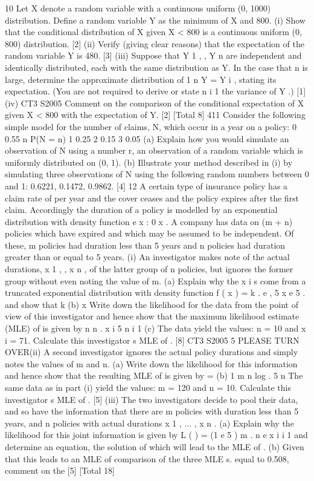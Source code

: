\documentclass[a4paper,12pt]{article}
\begin{document}
10
Let X denote a random variable with a continuous uniform (0, 1000) distribution.
Define a random variable Y as the minimum of X and 800.
(i)
Show that the conditional distribution of X given X < 800 is a continuous
uniform (0, 800) distribution.
[2]
(ii) Verify (giving clear reasons) that the expectation of the random variable Y is
480.
[3]
(iii) Suppose that Y 1 , , Y n are independent and identically distributed, each with
the same distribution as Y.
In the case that n is large, determine the approximate distribution of
1 n
Y =
Y i , stating its expectation. (You are not required to derive or state
n i 1
the variance of Y .)
[1]
(iv)
CT3 S2005
Comment on the comparison of the conditional expectation of X given X < 800
with the expectation of Y.
[2]
[Total 8]
411
Consider the following simple model for the number of claims, N, which occur in a
year on a policy:
0
0.55
n
P(N = n)
1
0.25
2
0.15
3
0.05
(a) Explain how you would simulate an observation of N using a number r, an
observation of a random variable which is uniformly distributed on (0, 1).
(b) Illustrate your method described in (i) by simulating three observations of N
using the following random numbers between 0 and 1:
0.6221, 0.1472, 0.9862.
[4]
12
A certain type of insurance policy has a claim rate of per year and the cover ceases
and the policy expires after the first claim. Accordingly the duration of a policy is
modelled by an exponential distribution with density function e x : 0 x
.
A company has data on (m + n) policies which have expired and which may be
assumed to be independent. Of these, m policies had duration less than 5 years and n
policies had duration greater than or equal to 5 years.
(i)
An investigator makes note of the actual durations, x 1 , , x n , of the latter
group of n policies, but ignores the former group without even noting the
value of m.
(a)
Explain why the x i s come from a truncated exponential distribution
with density function
f ( x ) = k . e
, 5
x
e 5 .
and show that k
(b)
x
Write down the likelihood for the data from the point of view of this
investigator and hence show that the maximum likelihood estimate
(MLE) of is given by
n
n
.
x i 5 n
i 1
(c)
The data yield the values: n = 10 and x i = 71. Calculate this
investigator s MLE of .
[8]
CT3 S2005
5
PLEASE TURN OVER(ii)
A second investigator ignores the actual policy durations and simply notes the
values of m and n.
(a)
Write down the likelihood for this information and hence show that the
resulting MLE of is given by
=
(b)
1
m n
log
.
5
n
The same data as in part (i) yield the values: m = 120 and n = 10.
Calculate this investigator s MLE of .
[5]
(iii)
The two investigators decide to pool their data, and so have the information
that there are m policies with duration less than 5 years, and n policies with
actual durations x 1 , ... , x n .
(a)
Explain why the likelihood for this joint information is given by
L ( ) = (1 e
5
) m .
n
e
x i
i 1
and determine an equation, the solution of which will lead to the MLE
of .
(b)
Given that this leads to an MLE of
comparison of the three MLE s.
equal to 0.508, comment on the
[5]
[Total 18]
\end{document}
